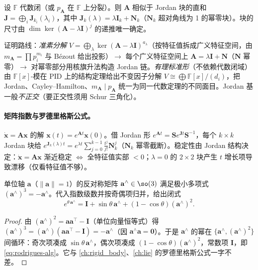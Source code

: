 \begin{theorem}\label{thm:jordan}
设 $\mathbb{F}$ 代数闭（或 $p_{\mathbf{A}}$ 在 $\mathbb{F}$ 上分裂）。则 $\mathbf{A}$ 相似于 Jordan 块的直和 $\mathbf{J}=\bigoplus_{i}\mathbf{J}_{k_i}(\lambda_i)$，其中 $\mathbf{J}_k(\lambda)=\lambda\mathbf{I}_k+\mathbf{N}_k$（$\mathbf{N}_k$ 超对角线为 1 的幂零块）。块的尺寸由 $\dim\ker(\mathbf{A}-\lambda\mathbf{I})^j$ 的递推唯一确定。
\end{theorem}

\noindent 证明路线：\emph{准素分解} $V=\bigoplus_\lambda\ker(\mathbf{A}-\lambda\mathbf{I})^{a_\lambda}$（按特征值拆成广义特征空间，由 $m_{\mathbf{A}}=\prod p_i^{m_i}$ 与 Bézout 给出投影）$\to$ 每个广义特征空间上 $\mathbf{A}=\lambda\mathbf{I}+\mathbf{N}$（$\mathbf{N}$ 幂零）$\to$ 对幂零部分用核旗升法构造 Jordan 链。\emph{有理标准形}（不依赖代数闭域）由 $\mathbb{F}[x]$-模在 PID 上的结构定理给出不变因子分解 $V\cong\bigoplus\mathbb{F}[x]/(d_i)$，把 Jordan、Cayley--Hamilton、$m_{\mathbf{A}}\mid p_{\mathbf{A}}$ 统一为同一代数定理的不同面目。Jordan 基一般\emph{不正交}（要正交性须用 Schur 三角化）。

\paragraph{矩阵指数与罗德里格斯公式。}
$\dot{\mathbf{x}}=\mathbf{A}\mathbf{x}$ 的解 $\mathbf{x}(t)=e^{\mathbf{A}t}\mathbf{x}(0)$。借 Jordan 形 $e^{\mathbf{A}t}=\mathbf{S}e^{\mathbf{J}t}\mathbf{S}^{-1}$，每个 $k\times k$ Jordan 块给 $e^{\mathbf{J}_k(\lambda)t}=e^{\lambda t}\sum_{j=0}^{k-1}\frac{t^j}{j!}\mathbf{N}_k^j$（$\mathbf{N}_k$ 幂零截断）。稳定性由 Jordan 结构决定：$\dot{\mathbf{x}}=\mathbf{A}\mathbf{x}$ 渐近稳定 $\iff$ 全特征值实部 $<0$；$\lambda=0$ 的 $2\times2$ 块产生 $t$ 增长项导致漂移（仅看特征值不够）。

\begin{theorem}\label{thm:rodrigues-alg}
单位轴 $\mathbf{a}$（$\|\mathbf{a}\|=1$）的反对称矩阵 $\mathbf{a}^\wedge\in\so(3)$ 满足极小多项式 $(\mathbf{a}^\wedge)^3=-\mathbf{a}^\wedge$。代入指数级数并按奇偶项归并，给出闭式
\begin{equation}
  e^{\theta\,\mathbf{a}^\wedge}=\mathbf{I}+\sin\theta\,\mathbf{a}^\wedge+(1-\cos\theta)(\mathbf{a}^\wedge)^2.
  \label{eq:rodrigues-alg}
\end{equation}
\end{theorem}
\begin{proof}
由 $(\mathbf{a}^\wedge)^2=\mathbf{a}\mathbf{a}^\top-\mathbf{I}$（单位向量恒等式）得 $(\mathbf{a}^\wedge)^3=(\mathbf{a}^\wedge)(\mathbf{a}\mathbf{a}^\top-\mathbf{I})=-\mathbf{a}^\wedge$（因 $\mathbf{a}^\wedge\mathbf{a}=\mathbf{0}$）。于是 $\mathbf{a}^\wedge$ 的幂在 $\{\mathbf{a}^\wedge,(\mathbf{a}^\wedge)^2\}$ 间循环：奇次项凑成 $\sin\theta\,\mathbf{a}^\wedge$，偶次项凑成 $(1-\cos\theta)(\mathbf{a}^\wedge)^2$，常数项 $\mathbf{I}$，即 \cref{eq:rodrigues-alg}。它与 \cref{ch:rigid_body}、\cref{ch:lie} 的罗德里格斯公式一字不差。
\end{proof}

